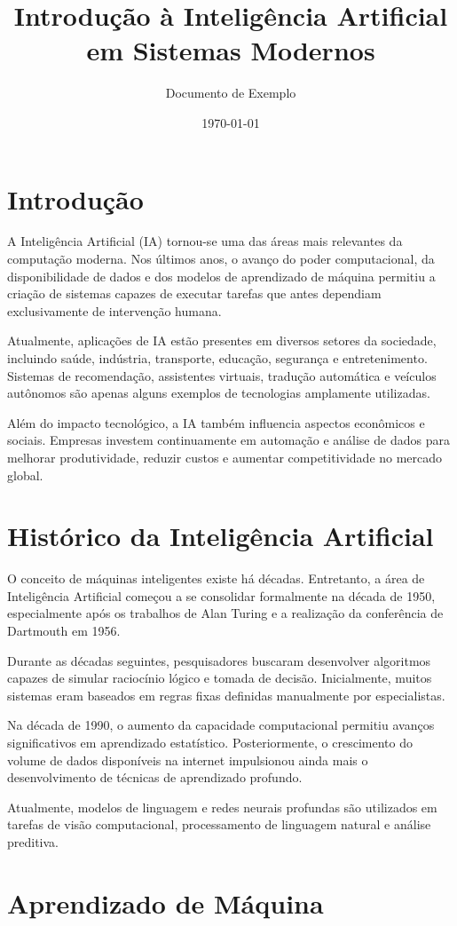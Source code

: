 \documentclass[11pt]{article}
\title{Introdução à Inteligência Artificial em Sistemas Modernos}
\author{Documento de Exemplo}
\date{\today}
\begin{document}
\section{Introdução}

A Inteligência Artificial (IA) tornou-se uma das áreas mais relevantes da computação moderna.
Nos últimos anos, o avanço do poder computacional, da disponibilidade de dados e dos modelos
de aprendizado de máquina permitiu a criação de sistemas capazes de executar tarefas que
antes dependiam exclusivamente de intervenção humana.

Atualmente, aplicações de IA estão presentes em diversos setores da sociedade, incluindo saúde,
indústria, transporte, educação, segurança e entretenimento. Sistemas de recomendação,
assistentes virtuais, tradução automática e veículos autônomos são apenas alguns exemplos
de tecnologias amplamente utilizadas.

Além do impacto tecnológico, a IA também influencia aspectos econômicos e sociais. Empresas
investem continuamente em automação e análise de dados para melhorar produtividade,
reduzir custos e aumentar competitividade no mercado global. 

\section{Histórico da Inteligência Artificial}

O conceito de máquinas inteligentes existe há décadas. Entretanto, a área de Inteligência
Artificial começou a se consolidar formalmente na década de 1950, especialmente após os
trabalhos de Alan Turing e a realização da conferência de Dartmouth em 1956.

Durante as décadas seguintes, pesquisadores buscaram desenvolver algoritmos capazes de
simular raciocínio lógico e tomada de decisão. Inicialmente, muitos sistemas eram baseados em
regras fixas definidas manualmente por especialistas.

Na década de 1990, o aumento da capacidade computacional permitiu avanços significativos em
aprendizado estatístico. Posteriormente, o crescimento do volume de dados disponíveis na
internet impulsionou ainda mais o desenvolvimento de técnicas de aprendizado profundo.

Atualmente, modelos de linguagem e redes neurais profundas são utilizados em tarefas de visão
computacional, processamento de linguagem natural e análise preditiva.
 

\section{Aprendizado de Máquina}
\end{document}
